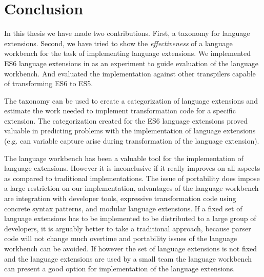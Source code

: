 
\chapter{Conclusion} %

\label{Chapter7} 


In this thesis we have made two contributions. First, a taxonomy for language extensions. Second, we have tried to show the \textit{effectiveness} of a language workbench for the task of implementing language extensions. We implemented ES6 language extensions in \projectname as an experiment to guide evaluation of the language workbench. And evaluated the implementation against other transpilers capable of transforming ES6 to ES5.

The taxonomy can be used to create a categorization of language extensions and estimate the work needed to implement transformation code for a specific extension. The categorization created for the ES6 language extensions proved valuable in predicting problems with the implementation of language extensions (e.g. can variable capture arise during transformation of the language extension).

The language workbench has been a valuable tool for the implementation of language extensions. However it is inconclusive if it really improves on all aspects as compared to traditional implementations. The issue of portability does impose a large restriction on our implementation, advantages of the language workbench are integration with developer tools, expressive transformation code using concrete syntax patterns, and modular language extensions. If a fixed set of language extensions has to be implemented to be distributed to a large group of developers, it is arguably better to take a traditional approach, because parser code will not change much overtime and portability issues of the language workbench can be avoided. If however the set of language extensions is not fixed and the language extensions are used by a small team the language workbench can present a good option for implementation of the language extensions.